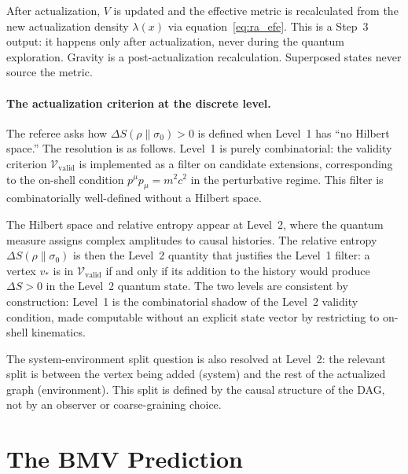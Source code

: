 \documentclass[11pt,a4paper]{article}
\theoremstyle{plain}
\theoremstyle{definition}
\theoremstyle{remark}
\newcommand{\Vvalid}{\mathcal{V}_{\mathrm{valid}}}
\begin{document}
\begin{description}[leftmargin=1.5em, itemsep=6pt]
  \item[\textbf{Step 5 --- The Hydrodynamic Limit (Level~3).}]
  After actualization, $V$ is updated and the effective metric is
  recalculated from the new actualization density $\lambda(x)$ via
  equation~\eqref{eq:ra_efe}. This is a Step~3 output: it happens only
  after actualization, never during the quantum exploration. Gravity is
  a post-actualization recalculation. Superposed states never source the
  metric.
\end{description}


\paragraph{The actualization criterion at the discrete level.}
The referee asks how $\Delta S(\rho\|\sigma_0) > 0$ is defined when
Level~1 has ``no Hilbert space.'' The resolution is as follows.
Level~1 is purely combinatorial: the validity criterion $\Vvalid$ is
implemented as a filter on candidate extensions, corresponding to the
on-shell condition $p^\mu p_\mu = m^2c^2$ in the perturbative regime.
This filter is combinatorially well-defined without a Hilbert space.

The Hilbert space and relative entropy appear at Level~2, where the quantum
measure assigns complex amplitudes to causal histories. The relative entropy
$\Delta S(\rho\|\sigma_0)$ is then the Level~2 quantity that justifies the
Level~1 filter: a vertex $v_*$ is in $\Vvalid$ if and only if its addition
to the history would produce $\Delta S > 0$ in the Level~2 quantum state.
The two levels are consistent by construction: Level~1 is the combinatorial
shadow of the Level~2 validity condition, made computable without an explicit
state vector by restricting to on-shell kinematics.

The system-environment split question is also resolved at Level~2: the
relevant split is between the vertex being added (system) and the rest of
the actualized graph (environment). This split is defined by the causal
structure of the DAG, not by an observer or coarse-graining choice.

\section{The BMV Prediction}
\label{sec:bmv}
\end{document}
